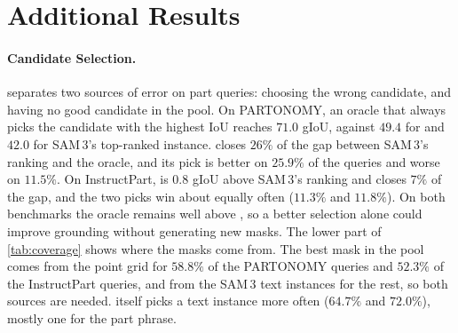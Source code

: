\renewcommand{\topfraction}{0.9}
\renewcommand{\bottomfraction}{0.8}
\renewcommand{\textfraction}{0.07}
\renewcommand{\floatpagefraction}{0.85}
\setcounter{topnumber}{3}
\setcounter{totalnumber}{5}



\section{Additional Results}
\label{sec:supp_results}

\paragraph{Candidate Selection.}
\label{sec:supp_coverage}
 separates two sources of error on part queries: choosing the wrong candidate, and having no good
candidate in the pool. On PARTONOMY, an oracle that always picks the candidate with the highest IoU reaches $71.0$
gIoU, against $49.4$ for \ours{} and $42.0$ for SAM\,3's top-ranked instance. \ours{} closes $26\%$ of the gap between
SAM\,3's ranking and the oracle, and its pick is better on $25.9\%$ of the queries and worse on $11.5\%$. On
InstructPart, \ours{} is $0.8$ gIoU above SAM\,3's ranking and closes $7\%$ of the gap, and the two picks win about
equally often ($11.3\%$ and $11.8\%$). On both benchmarks the oracle remains well above \ours{}, so a better
selection alone could improve grounding without generating new masks. The lower part of \cref{tab:coverage} shows
where the masks come from. The best mask in the pool comes from the point grid for $58.8\%$ of the PARTONOMY queries
and $52.3\%$ of the InstructPart queries, and from the SAM\,3 text instances for the rest, so both sources are needed.
\ours{} itself picks a text instance more often ($64.7\%$ and $72.0\%$), mostly one for the part phrase.




